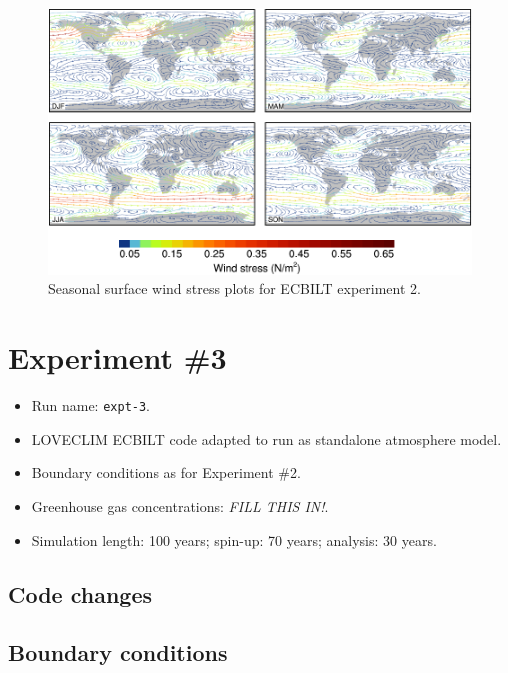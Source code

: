 \documentclass[a4paper,11pt]{article}
\begin{document}
\begin{figure}
  \begin{center}
    \includegraphics[width=\textwidth]{../expt-2/plots/stress-plots}
  \end{center}
  \caption{Seasonal surface wind stress plots for ECBILT experiment
    2.}
  \label{fig:stress-2}
\end{figure}


\section{Experiment \#3}

\begin{itemize}
  \item{Run name: \texttt{expt-3}.}
  \item{LOVECLIM ECBILT code adapted to run as standalone atmosphere
    model.}
  \item{Boundary conditions as for Experiment \#2.}
  \item{Greenhouse gas concentrations: \emph{FILL THIS IN!}.}
  \item{Simulation length: 100 years; spin-up: 70 years; analysis: 30
    years.}
\end{itemize}

\subsection{Code changes}


\subsection{Boundary conditions}
\end{document}
